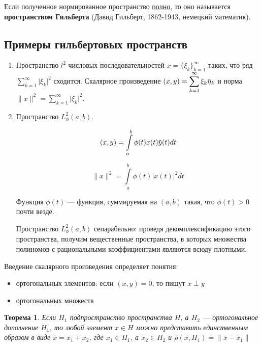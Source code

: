 \documentclass[12pt,a4paper,titlepage,oneside]{book}
\newcommand{\overbar}[1]{\mkern 1.5mu\overline{\mkern-1.5mu#1\mkern-1.5mu}\mkern 1.5mu}
\theoremstyle{definition}
\theoremstyle{plain}
\newtheorem*{theorem}{Теорема}
\theoremstyle{remark}
\theoremstyle{remark}
\theoremstyle{remark}
\theoremstyle{remark}
\theoremstyle{plain}
\theoremstyle{plain}
\begin{document}
Если полученное нормированное пространство \underline{полно}, то оно называется \textbf{пространством Гильберта} (Давид Гильберт, 1862-1943, немецкий математик).

\subsection*{Примеры гильбертовых пространств}

\begin{enumerate}
	\item Пространство $l^2$ числовых последовательностей $x = \lbrace \xi_k \rbrace_{k=1}^{\infty}$ таких, что ряд $\displaystyle\sum_{k=1}^{\infty} \lvert \xi_k \rvert^2$ сходится. Скалярное произведение $(x, y) = \displaystyle\sum_{k=1}^{\infty} \xi_k \overbar{\eta}_k$ и норма $\parallel x \parallel^2 = \displaystyle\sum_{k=1}^{\infty} \lvert \xi_k \rvert^2$.
	
	\item Пространство $L_{\phi}^2 (a, b)$.
	
	$$ (x, y) = \displaystyle\int\limits_a^b \phi(t) x(t) \overbar{y}(t) dt$$
	
	$$ \parallel x \parallel^2 = \displaystyle\int\limits_a^b \phi(t) \lvert x(t) \rvert^2 dt$$
	
	Функция $\phi(t)$ --- функция, суммируемая на $(a, b)$ такая, что $\phi(t) > 0$ почти везде.
	
	Пространство $L_{\phi}^2 (a, b)$ сепарабельно: проведя декомплексификацию этого пространства, получим вещественные пространства, в которых множества полиномов с рациональными коэффициентами являются всюду плотными.
\end{enumerate}

Введение скалярного произведения определяет понятия:

\begin{itemize}
	\item ортогональных элементов: если $(x, y) = 0$, то пишут $x \perp y$
	
	\item ортогональных множеств
\end{itemize}

\begin{theorem}
	Если $H_1$ подпространство пространства $H$, а $H_2$ --- ортогональное дополнение $H_1$, то любой элемент $x \in H$ можно представить единственным образом в виде $x = x_1 + x_2$, где $x_1 \in H_1$, а $x_2 \in H_2$ и $\rho(x, H_1) = \parallel x - x_1 \parallel$
\end{theorem}
\end{document}
